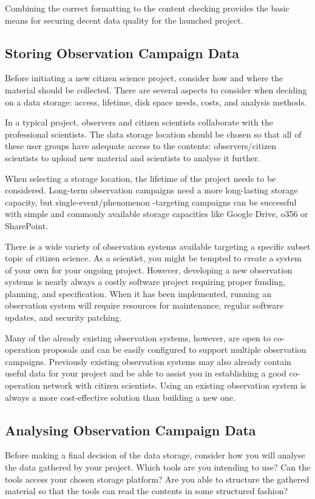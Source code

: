 \documentclass{article}
\newcommand{\contributed}[1]{%
    \par\noindent
    \begingroup
    \setlength{\leftskip}{1em}%
    \itshape
    Contributors: #1
    \par
    \endgroup
    \vspace{0.5em}
}
\begin{document}
Combining the correct formatting to the content checking provides the basic means for securing decent data quality for the launched project.

\subsection{Storing Observation Campaign Data}\label{sed:data_stoarge}
Before initiating a new citizen science project, consider how and where the material should be collected. There are several aspects to consider when deciding on a data storage: access, lifetime, disk space needs, costs, and analysis methods. 

In a typical project, observers and citizen scientists collaborate with the professional scientists. The data storage location should be chosen so that all of these user groups have adequate access to the contents: observers/citizen scientists to upload new material and scientists to analyse it further.

When selecting a storage location, the lifetime of the project needs to be considered. Long-term observation campaigns need a more long-lasting storage capacity, but single-event/phenomenon -targeting campaigns can be successful with simple and commonly available storage capacities like Google Drive, o356 or SharePoint.

There is a wide variety of observation systems available targeting a specific subset topic of citizen science. As a scientist, you might be tempted to create a system of your own for your ongoing project. However, developing a new observation systems is nearly always a costly software project requiring proper funding, planning, and specification. When it has been implemented, running an observation system will require resources for maintenance, regular software updates, and security patching. 

Many of the already existing observation systems, however, are open to co-operation proposals and can be easily configured to support multiple observation campaigns. Previously existing observation systems may also already contain useful data for your project and be able to assist you in establishing a good co-operation network with citizen scientists. Using an existing observation system is always a more cost-effective solution than building a new one. 

\subsection{Analysing Observation Campaign Data}\label{sed:data_storage}
Before making a final decision of the data storage, consider how you will analyse the data gathered by your project. Which tools are you intending to use? Can the tools access your chosen storage platform? Are you able to structure the gathered material so that the tools can read the contents in some structured fashion?
\end{document}
